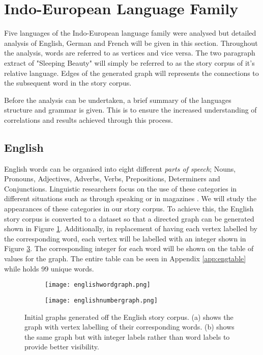\section{Indo-European Language Family}
Five languages of the Indo-European language family were analysed but detailed analysis of English, German and French will be given in this section. Throughout the analysis, words are referred to as vertices and vice versa. The two paragraph extract of "Sleeping Beauty" will simply be referred to as the story corpus of it's relative language. Edges of the generated graph will represents the connections to the subsequent word in the story corpus. 

Before the analysis can be undertaken, a brief summary of the languages structure and grammar is given. This is to ensure the increased understanding of correlations and results achieved through this process.

\subsection{English}
English words can be organised into eight different \emph{parts of speech}; Nouns, Pronouns, Adjectives, Adverbs, Verbs, Prepositions, Determiners and Conjunctions. Linguistic researchers focus on the use of these categories in different situations such as through speaking or in magazines \cite{khaisaeng2017study}. We will study the appearances of these categories in our story corpus. To achieve this, the English story corpus is converted to a dataset so that a directed graph can be generated shown in Figure \ref{fig:engword}. Additionally, in replacement of having each vertex labelled by the corresponding word, each vertex will be labelled with an integer shown in Figure \ref{fig:engnum}. The corresponding integer for each word will be shown on the table of values for the graph. The entire table can be seen in Appendix \ref{app:engtable} while holds 99 unique words.

\begin{figure}[H]
\centering
\begin{subfigure}{.45\textwidth}
	\texttt{[image: englishwordgraph.png]}
	\caption{}
	\label{fig:engword}
\end{subfigure}
\hfill
\begin{subfigure}{.45\textwidth}
	\texttt{[image: englishnumbergraph.png]}
	\caption{}
	\label{fig:engnum}
\end{subfigure}
\caption{Initial graphs generated off the English story corpus. (a) shows the graph with vertex labelling of their corresponding words. (b) shows the same graph but with integer labels rather than word labels to provide better visibility.}
\end{figure}

